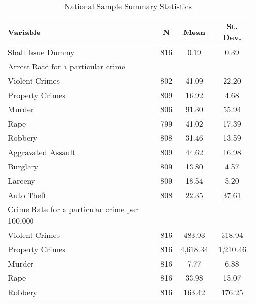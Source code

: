 \documentclass{article}
\begin{document}
\begin{table}[H] \centering 
  \caption{National Sample Summary Statistics} 
  \label{tab:summary} 
\begin{tabular}[h]{@{\extracolsep{5pt}}lccc}
\toprule 
Variable & \multicolumn{1}{c}{N} & \multicolumn{1}{c}{Mean} & \multicolumn{1}{c}{St. Dev.} \\ 
\midrule
Shall Issue Dummy & 816 & 0.19 & 0.39 \\ 
Arrest Rate for a particular crime &&&\\
\hspace{3mm}Violent Crimes & 802 & 41.09 & 22.20 \\ 
\hspace{3mm}Property Crimes & 809 & 16.92 & 4.68 \\ 
\hspace{3mm}Murder & 806 & 91.30 & 55.94 \\ 
\hspace{3mm}Rape & 799 & 41.02 & 17.39 \\ 
\hspace{3mm}Robbery & 808 & 31.46 & 13.59 \\ 
\hspace{3mm}Aggravated Assault & 809 & 44.62 & 16.98 \\ 
\hspace{3mm}Burglary & 809 & 13.80 & 4.57 \\ 
\hspace{3mm}Larceny & 809 & 18.54 & 5.20 \\ 
\hspace{3mm}Auto Theft & 808 & 22.35 & 37.61 \\ 
Crime Rate for a particular crime per 100,000 &&&\\
\hspace{3mm}Violent Crimes & 816 & 483.93 & 318.94 \\ 
\hspace{3mm}Property Crimes & 816 & 4,618.34 & 1,210.46 \\ 
\hspace{3mm}Murder & 816 & 7.77 & 6.88 \\ 
\hspace{3mm}Rape & 816 & 33.98 & 15.07 \\ 
\hspace{3mm}Robbery& 816 & 163.42 & 176.25 \\ 

\end{tabular}
\end{table}
\end{document}
